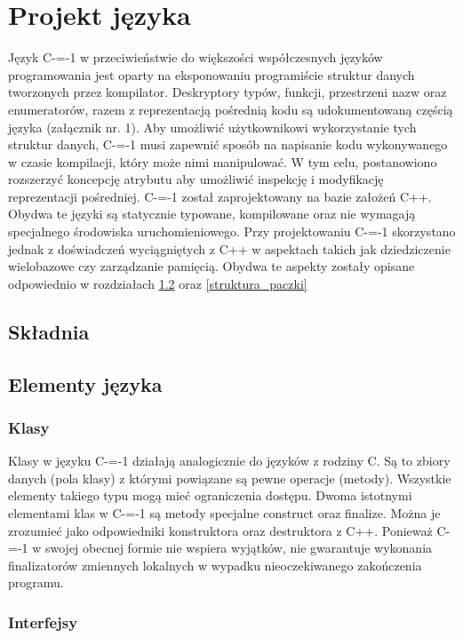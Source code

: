 \section{Projekt języka}
\label{Language_desig}
Język C-=-1 w przeciwieństwie do większości współczesnych języków programowania jest oparty na eksponowaniu programiście struktur danych tworzonych przez kompilator. Deskryptory typów, funkcji, przestrzeni nazw oraz enumeratorów, razem z reprezentacją pośrednią kodu są udokumentowaną częścią języka (załącznik nr. 1).
Aby umożliwić użytkownikowi wykorzystanie tych struktur danych, C-=-1 musi zapewnić sposób na napisanie kodu wykonywanego w czasie kompilacji, który może nimi manipulować. W tym celu, postanowiono rozszerzyć koncepcję atrybutu aby umożliwić inspekcję i modyfikację reprezentacji pośredniej.
C-=-1 został zaprojektowany na bazie założeń C++. Obydwa te języki są statycznie typowane, kompilowane oraz nie wymagają specjalnego środowiska uruchomieniowego. Przy projektowaniu C-=-1 skorzystano jednak z doświadczeń wyciągniętych z C++ w aspektach takich jak dziedziczenie wielobazowe czy zarządzanie pamięcią. Obydwa te aspekty zostały opisane odpowiednio w rozdziałach \ref{elementy_jezyka} oraz \ref{struktura_paczki}
\subsection{Składnia}
\subsection{Elementy języka}\label{elementy_jezyka}
\subsubsection{Klasy}\label{klasy}
Klasy w języku C-=-1 działają analogicznie do języków z rodziny C. Są to zbiory danych (pola klasy) z którymi powiązane są pewne operacje (metody). Wszystkie elementy takiego typu mogą mieć ograniczenia dostępu.
Dwoma istotnymi elementami klas w C-=-1 są metody specjalne construct oraz finalize. Można je zrozumieć jako odpowiedniki konstruktora oraz destruktora z C++. Ponieważ C-=-1 w swojej obecnej formie nie wspiera wyjątków, nie gwarantuje wykonania finalizatorów zmiennych lokalnych w wypadku nieoczekiwanego zakończenia programu.
\subsubsection{Interfejsy}
